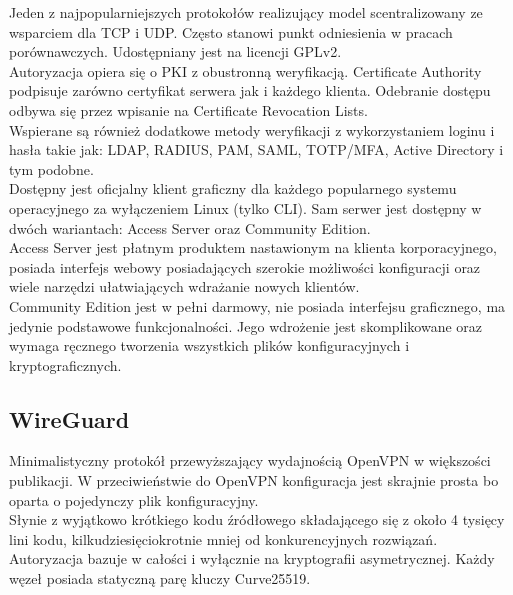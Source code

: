 Jeden z najpopularniejszych protokołów realizujący model scentralizowany ze wsparciem dla TCP i UDP. Często stanowi punkt odniesienia w pracach porównawczych. Udostępniany jest na licencji GPLv2.\\

Autoryzacja opiera się o PKI z obustronną weryfikacją. Certificate Authority podpisuje zarówno certyfikat serwera jak i każdego klienta. Odebranie dostępu odbywa się przez wpisanie na Certificate Revocation Lists.\\

Wspierane są również dodatkowe metody weryfikacji z wykorzystaniem loginu i hasła takie jak: LDAP, RADIUS, PAM, SAML, TOTP/MFA, Active Directory i tym podobne.\\

Dostępny jest oficjalny klient graficzny dla każdego popularnego systemu operacyjnego za wyłączeniem Linux (tylko CLI). Sam serwer jest dostępny w dwóch wariantach: Access Server oraz Community Edition.\\

Access Server jest płatnym produktem nastawionym na klienta korporacyjnego, posiada interfejs webowy posiadających szerokie możliwości konfiguracji oraz wiele narzędzi ułatwiających wdrażanie nowych klientów.\\

Community Edition jest w pełni darmowy, nie posiada interfejsu graficznego, ma jedynie podstawowe funkcjonalności. Jego wdrożenie jest skomplikowane oraz wymaga ręcznego tworzenia wszystkich plików konfiguracyjnych i kryptograficznych.\\

\newpage
\subsection{WireGuard}

Minimalistyczny protokół przewyższający wydajnością OpenVPN w większości publikacji. W przeciwieństwie do OpenVPN konfiguracja jest skrajnie prosta bo oparta o pojedynczy plik konfiguracyjny.\\

Słynie z wyjątkowo krótkiego kodu źródłowego składającego się z około 4 tysięcy lini kodu, kilkudziesięciokrotnie mniej od konkurencyjnych rozwiązań.\\

Autoryzacja bazuje w całości i wyłącznie na kryptografii asymetrycznej. Każdy węzeł posiada statyczną parę kluczy Curve25519.\\

